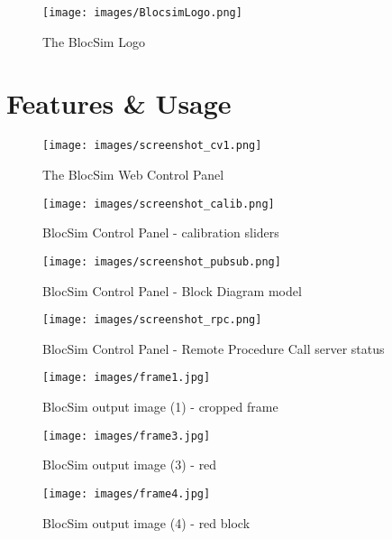 \begin{figure}[ht!]
\centering
\texttt{[image: images/BlocsimLogo.png]}
\caption{The BlocSim Logo \cite{blocsim2014}}
\label{im:blocsimlogo}
\end{figure}



\section{Features \& Usage}

\begin{figure}[ht!]
\centering
\texttt{[image: images/screenshot\_cv1.png]}
\caption{The BlocSim Web Control Panel \cite{blocsim2014}}
\label{im:screenshot_cv1}
\end{figure}

\begin{figure}[ht!]
\centering
\texttt{[image: images/screenshot\_calib.png]}
\caption{BlocSim Control Panel - calibration sliders \cite{blocsim2014}}
\label{im:screenshot_calib}
\end{figure}

\begin{figure}[ht!]
\centering
\texttt{[image: images/screenshot\_pubsub.png]}
\caption{BlocSim Control Panel - Block Diagram model \cite{blocsim2014}}
\label{im:screenshot_pubsub}
\end{figure}

\begin{figure}[ht!]
\centering
\texttt{[image: images/screenshot\_rpc.png]}
\caption{BlocSim Control Panel - Remote Procedure Call server status \cite{blocsim2014}}
\label{im:screenshot_rpc}
\end{figure}

\clearpage





\begin{figure}[ht!]
\centering
\texttt{[image: images/frame1.jpg]}
\caption{BlocSim output image (1) - cropped frame \cite{blocsim2014}}
\label{im:frame1}
\end{figure}

\begin{figure}[ht!]
\centering
\texttt{[image: images/frame3.jpg]}
\caption{BlocSim output image (3) - red \cite{blocsim2014}}
\label{im:frame3}
\end{figure}

\begin{figure}[ht!]
\centering
\texttt{[image: images/frame4.jpg]}
\caption{BlocSim output image (4) - red block \cite{blocsim2014}}
\label{im:frame4}
\end{figure}

